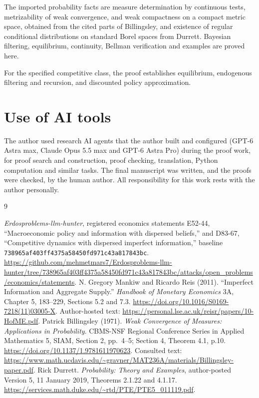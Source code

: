 \documentclass[11pt,a4paper]{article}
\begin{document}
The imported probability facts are measure determination by continuous tests,
metrizability of weak convergence, and weak compactness on a compact metric
space, obtained from the cited parts of Billingsley, and existence of regular
conditional distributions on standard Borel spaces from Durrett. Bayesian
filtering, equilibrium, continuity, Bellman
verification and examples are proved here.

For the specified competitive class, the proof establishes equilibrium,
endogenous filtering and recursion, and discounted policy approximation.

\section*{Use of AI tools}
The author used research AI agents that the author built and configured (GPT-6 Astra max,
Claude Opus 5.5 max and GPT-6 Astra Pro) during the proof work, for proof search and
construction, proof checking, translation, Python computation and similar tasks. The final
manuscript was written, and the proofs were checked, by the human author. All responsibility
for this work rests with the author personally.

\begin{thebibliography}{9}
\small\raggedright
{}
\emph{Erdosproblems-llm-hunter}, registered economics statements E52-44,
``Macroeconomic policy and information with dispersed beliefs,'' and D83-67,
``Competitive dynamics with dispersed imperfect information,'' baseline
\texttt{738965af403ff4375a58450fd971c43a817843bc}.
\url{https://github.com/mehmetmars7/Erdosproblems-llm-hunter/tree/738965af403ff4375a58450fd971c43a817843bc/attacks/open_problems/economics/statements}.
N. Gregory Mankiw and Ricardo Reis (2011).
``Imperfect Information and Aggregate Supply.''
\emph{Handbook of Monetary Economics} 3A, Chapter 5, 183--229,
Sections 5.2 and 7.3.
\url{https://doi.org/10.1016/S0169-7218(11)03005-X}.
Author-hosted text:
\url{https://personal.lse.ac.uk/reisr/papers/10-HofME.pdf}.
Patrick Billingsley (1971).
\emph{Weak Convergence of Measures: Applications in Probability}.
CBMS-NSF Regional Conference Series in Applied Mathematics 5, SIAM,
Section 2, pp.\ 4--5; Section 4, Theorem 4.1, p.10.
\url{https://doi.org/10.1137/1.9781611970623}.
Consulted text:
\url{https://www.math.ucdavis.edu/~gravner/MAT236A/materials/Billingsley-paper.pdf}.
Rick Durrett.
\emph{Probability: Theory and Examples}, author-posted Version 5,
11 January 2019, Theorems 2.1.22 and 4.1.17.
\url{https://services.math.duke.edu/~rtd/PTE/PTE5_011119.pdf}.
\end{thebibliography}
\end{document}
